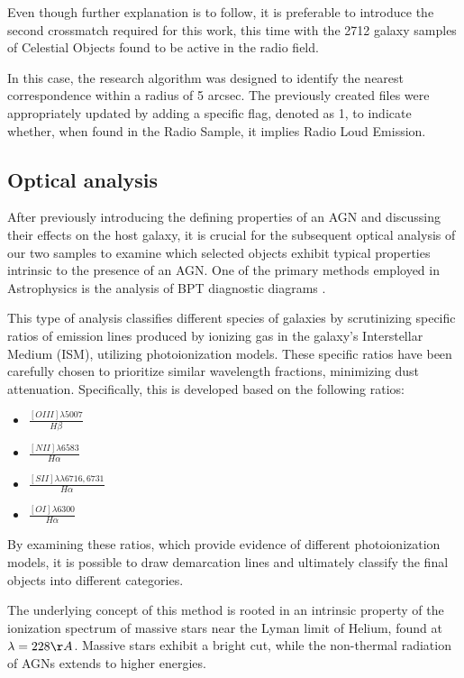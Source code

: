 Even though further explanation is to follow, it is preferable to introduce the second crossmatch required for this work, this time with the 2712 galaxy samples of Celestial Objects found to be active in the radio field.

In this case, the research algorithm was designed to identify the nearest correspondence within a radius of 5 arcsec. The previously created files were appropriately updated by adding a specific flag, denoted as 1, to indicate whether, when found in the Radio Sample, it implies Radio Loud Emission.

\subsection{Optical analysis}
After previously introducing the defining properties of an AGN and discussing their effects on the host galaxy, it is crucial for the subsequent optical analysis of our two samples to examine which selected objects exhibit typical properties intrinsic to the presence of an AGN. One of the primary methods employed in Astrophysics is the analysis of BPT diagnostic diagrams \cite{1981PASP...93....5B}.

This type of analysis classifies different species of galaxies by scrutinizing specific ratios of emission lines produced by ionizing gas in the galaxy's Interstellar Medium (ISM), utilizing photoionization models. These specific ratios have been carefully chosen to prioritize similar wavelength fractions, minimizing dust attenuation. Specifically, this is developed based on the following ratios:
\begin{multicols}{2}
\begin{itemize}
    \item \textbf{$\frac{[OIII]\lambda 5007}{H\beta}$}
    \item \textbf{$\frac{[NII]\lambda 6583}{H\alpha}$}
    \item \textbf{$\frac{[SII]\lambda\lambda 6716,6731}{H\alpha}$}
    \item \textbf{$\frac{[OI]\lambda 6300}{H\alpha}$}
\end{itemize}
\end{multicols}

By examining these ratios, which provide evidence of different photoionization models, it is possible to draw demarcation lines and ultimately classify the final objects into different categories.

The underlying concept of this method is rooted in an intrinsic property of the ionization spectrum of massive stars near the Lyman limit of Helium, found at $\lambda = 228\AA$. Massive stars exhibit a bright cut, while the non-thermal radiation of AGNs extends to higher energies. 

